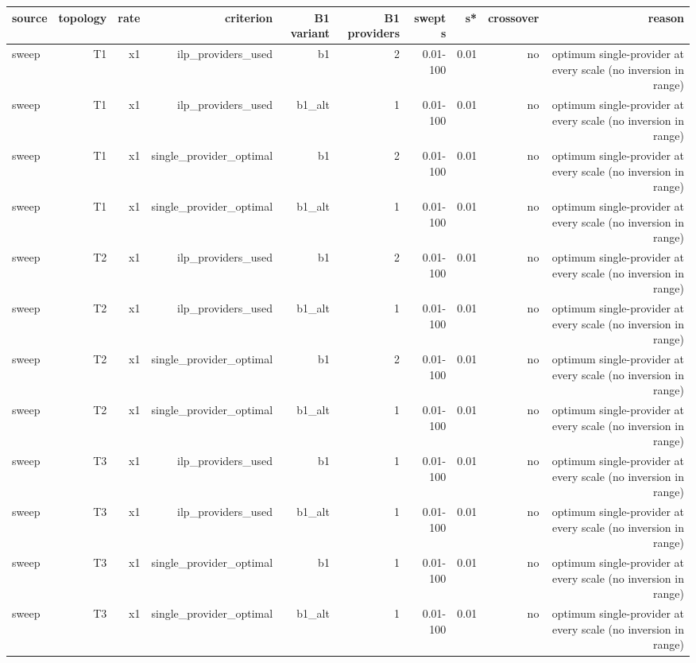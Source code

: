 \begin{table}[t]
\centering
\small
\begin{tabular}{lrrrrrrrrr}
\toprule
source & topology & rate & criterion & B1 variant & B1 providers & swept s & s* & crossover & reason \\
\midrule
sweep & T1 & x1 & ilp\_providers\_used & b1 & 2 & 0.01-100 & 0.01 & no & optimum single-provider at every scale (no inversion in range) \\
sweep & T1 & x1 & ilp\_providers\_used & b1\_alt & 1 & 0.01-100 & 0.01 & no & optimum single-provider at every scale (no inversion in range) \\
sweep & T1 & x1 & single\_provider\_optimal & b1 & 2 & 0.01-100 & 0.01 & no & optimum single-provider at every scale (no inversion in range) \\
sweep & T1 & x1 & single\_provider\_optimal & b1\_alt & 1 & 0.01-100 & 0.01 & no & optimum single-provider at every scale (no inversion in range) \\
sweep & T2 & x1 & ilp\_providers\_used & b1 & 2 & 0.01-100 & 0.01 & no & optimum single-provider at every scale (no inversion in range) \\
sweep & T2 & x1 & ilp\_providers\_used & b1\_alt & 1 & 0.01-100 & 0.01 & no & optimum single-provider at every scale (no inversion in range) \\
sweep & T2 & x1 & single\_provider\_optimal & b1 & 2 & 0.01-100 & 0.01 & no & optimum single-provider at every scale (no inversion in range) \\
sweep & T2 & x1 & single\_provider\_optimal & b1\_alt & 1 & 0.01-100 & 0.01 & no & optimum single-provider at every scale (no inversion in range) \\
sweep & T3 & x1 & ilp\_providers\_used & b1 & 1 & 0.01-100 & 0.01 & no & optimum single-provider at every scale (no inversion in range) \\
sweep & T3 & x1 & ilp\_providers\_used & b1\_alt & 1 & 0.01-100 & 0.01 & no & optimum single-provider at every scale (no inversion in range) \\
sweep & T3 & x1 & single\_provider\_optimal & b1 & 1 & 0.01-100 & 0.01 & no & optimum single-provider at every scale (no inversion in range) \\
sweep & T3 & x1 & single\_provider\_optimal & b1\_alt & 1 & 0.01-100 & 0.01 & no & optimum single-provider at every scale (no inversion in range) \\

\end{tabular}
\end{table}
